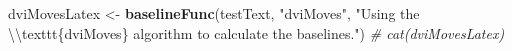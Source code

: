 \documentclass[]{article}
\newenvironment{Shaded}{\begin{snugshade}}{\end{snugshade}}
\newcommand{\KeywordTok}[1]{\textcolor[rgb]{0.13,0.29,0.53}{\textbf{#1}}}
\newcommand{\CharTok}[1]{\textcolor[rgb]{0.31,0.60,0.02}{#1}}
\newcommand{\StringTok}[1]{\textcolor[rgb]{0.31,0.60,0.02}{#1}}
\newcommand{\CommentTok}[1]{\textcolor[rgb]{0.56,0.35,0.01}{\textit{#1}}}
\newcommand{\NormalTok}[1]{#1}
\begin{document}
\newsavebox{\dvibox} \newlength{\dviwidth}

\newcommand{\boxreport}[2]{%
  \sbox{\dvibox}{\parbox[b]{2in}{#1}}%
  \settowidth {\dviwidth} {\usebox{\dvibox}}%
  \usebox{\dvibox}%
  \vspace{-#2}%
  \hrule width \dviwidth \relax
  \vspace{#2}%
}

\newcommand{\boxpersist}[1]{%
  \vspace{-#1}
  \hrule width \dviwidth \relax
  \vspace{#1}%
}


\begin{Shaded}
\begin{Highlighting}[]
\NormalTok{dviMovesLatex <-}\StringTok{ }\KeywordTok{baselineFunc}\NormalTok{(testText, }\StringTok{"dviMoves"}\NormalTok{, }\StringTok{"Using the }\CharTok{\textbackslash{}\textbackslash{}}\StringTok{texttt\{dviMoves\} algorithm to calculate the baselines."}\NormalTok{)}
\CommentTok{# cat(dviMovesLatex)}
\end{Highlighting}
\end{Shaded}
\end{document}
